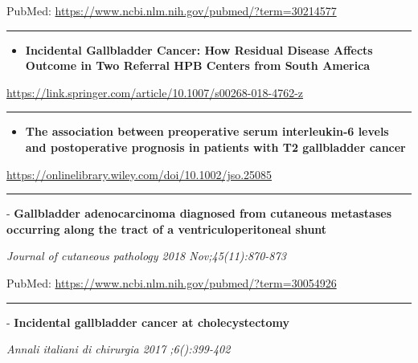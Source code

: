 \documentclass[]{article}
\providecommand{\tightlist}{%
  \setlength{\itemsep}{0pt}\setlength{\parskip}{0pt}}
\begin{document}
PubMed: \url{https://www.ncbi.nlm.nih.gov/pubmed/?term=30214577}

{}

{}

\begin{center}\rule{0.5\linewidth}{\linethickness}\end{center}

\begin{itemize}
\tightlist
\item
  \textbf{Incidental Gallbladder Cancer: How Residual Disease Affects
  Outcome in Two Referral HPB Centers from South America}
\end{itemize}

\url{https://link.springer.com/article/10.1007/s00268-018-4762-z}

\begin{center}\rule{0.5\linewidth}{\linethickness}\end{center}

\begin{itemize}
\tightlist
\item
  \textbf{The association between preoperative serum interleukin‐6
  levels and postoperative prognosis in patients with T2 gallbladder
  cancer}
\end{itemize}

\url{https://onlinelibrary.wiley.com/doi/10.1002/jso.25085}

\begin{center}\rule{0.5\linewidth}{\linethickness}\end{center}

 - \textbf{Gallbladder adenocarcinoma diagnosed from cutaneous
metastases occurring along the tract of a ventriculoperitoneal shunt}

\emph{Journal of cutaneous pathology 2018 Nov;45(11):870-873}

PubMed: \url{https://www.ncbi.nlm.nih.gov/pubmed/?term=30054926}

{}

{}

\begin{center}\rule{0.5\linewidth}{\linethickness}\end{center}

 - \textbf{Incidental gallbladder cancer at cholecystectomy}

\emph{Annali italiani di chirurgia 2017 ;6():399-402}
\end{document}
